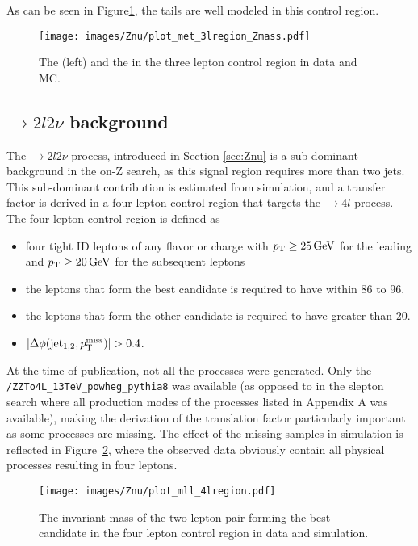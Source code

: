 As can be seen in Figure\ref{fig:WZmetOnZ}, the \ptmiss tails are well modeled in this control region.
\begin{figure}[htbp!]
\begin{center}
\texttt{[image: images/Znu/plot\_met\_3lregion\_Zmass.pdf]}
\caption{The \ptmiss (left) and the \mttwo in the three lepton control region in data and MC. }
\label{fig:WZmetOnZ}
\end{center}
\end{figure}
\subsection*{\PZZ$\rightarrow2l2\nu$ background}
\noindent
The \PZZ$\rightarrow 2l2\nu$ process, introduced in Section \ref{sec:Znu} is a sub-dominant background in the on-Z search, as this signal region requires more than two jets.
This sub-dominant contribution is estimated from simulation, and a transfer factor is derived in a four lepton control region that targets the \PZZ$\rightarrow4l$ process. 
The four lepton control region is defined as
\begin{itemize}
    \item four tight ID leptons of any flavor or charge with $p_{\mathrm{T}}\geq25\,\text{Ge\hspace{-.08em}V}$ for the leading and $p_{\mathrm{T}}\geq20\,\text{Ge\hspace{-.08em}V}$ for the subsequent leptons
    \item the leptons that form the best \PZ candidate is required to have \mll within 86 to 96\GeV.
    \item the leptons that form the other \PZ candidate is required to have \mll greater than 20\GeV.
    \item $|\Delta\phi(\mathrm{jet_{1,2}}, \ptmiss)|>0.4$.
\end{itemize}
\newpara
\noindent\justify
At the time of publication, not all the \PZZ processes were generated.
Only the \texttt{/ZZTo4L\_13TeV\_powheg\_pythia8} was available (as opposed to in the slepton search where all production modes of the \PZZ processes listed in Appendix A was available), making the derivation of the translation factor particularly important as some processes are missing.
The effect of the missing samples in simulation is reflected in Figure~\ref{fig:ZZonZ}, where the observed data obviously contain all physical processes resulting in four leptons.
\begin{figure}[htbp!]
\begin{center}
\texttt{[image: images/Znu/plot\_mll\_4lregion.pdf]}
\caption{The invariant mass of the two lepton pair forming the best \PZ candidate in the four lepton control region in data and simulation.}
\label{fig:ZZonZ}
\end{center}
\end{figure}

